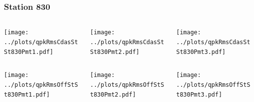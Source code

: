 \documentclass[aspectratio=169]{beamer}
\begin{document}
\begin{frame} 
  \frametitle{Station 830}
  \begin{center}
    \begin{columns}
      \begin{column}{0.33\textwidth}
        \texttt{[image: ../plots/qpkRmsCdasStSt830Pmt1.pdf]}
      \end{column}
      \begin{column}{0.33\textwidth}
        \texttt{[image: ../plots/qpkRmsCdasStSt830Pmt2.pdf]}
      \end{column}
      \begin{column}{0.33\textwidth}
        \texttt{[image: ../plots/qpkRmsCdasStSt830Pmt3.pdf]}
      \end{column}
    \end{columns}
  \end{center}

  \begin{center}
    \begin{columns}
      \begin{column}{0.33\textwidth}
        \texttt{[image: ../plots/qpkRmsOffStSt830Pmt1.pdf]}
      \end{column}
      \begin{column}{0.33\textwidth}
        \texttt{[image: ../plots/qpkRmsOffStSt830Pmt2.pdf]}
      \end{column}
      \begin{column}{0.33\textwidth}
        \texttt{[image: ../plots/qpkRmsOffStSt830Pmt3.pdf]}
      \end{column}
    \end{columns}
  \end{center}
\end{frame}
\end{document}
